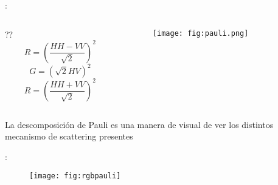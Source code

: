 \begin{frame}{\secname : \subsecname}
  \begin{columns}
    \begin{column}{0.5\textwidth}
     \begin{block}{??}
      \begin{equation}
        R = \left(\frac{HH-VV}{\sqrt{2}}\right)^2
      \end{equation}
      \begin{equation}
        G = \left(\sqrt{2}HV\right)^2
      \end{equation}
      \begin{equation}
        R = \left(\frac{HH+VV}{\sqrt{2}}\right)^2
      \end{equation}
     \end{block}
    \end{column}
    \begin{column}{0.5\textwidth}  %
      \begin{figure}
        \centering
        \texttt{[image: fig:pauli.png]}
        \caption{}
        \label{}
      \end{figure}
    \end{column}
    \end{columns}
    La descomposición de Pauli es una manera de visual de ver los distintos mecanismo de scattering presentes
\end{frame}

\begin{frame}{\secname : \subsecname}
  \begin{figure}
    \centering
    \texttt{[image: fig:rgbpauli]}
    \caption{}
    \label{}
  \end{figure}
\end{frame}
